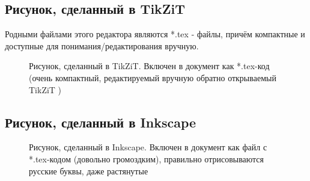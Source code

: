

\subsection{Рисунок, сделанный в TikZiT}

Родными файлами этого редактора являются *.tex - файлы, причём компактные и доступные для
понимания/редактирования вручную.

\begin{figure}[H] \centering
\caption{Рисунок, сделанный в TikZiT. Включен в документ как *.tex-код (очень компактный, редактируемый вручную обратно открываемый TikZiT )}
\label{ris:image1_TikZiT}
\end{figure}



\subsection{Рисунок, сделанный в Inkscape}

\begin{figure}[H] \centering

\caption{Рисунок, сделанный в Inkscape. Включен в документ как файл с *.tex-кодом (довольно громоздким), правильно отрисовываются русские буквы, даже растянутые}
\label{ris:image1_ink}
\end{figure}



